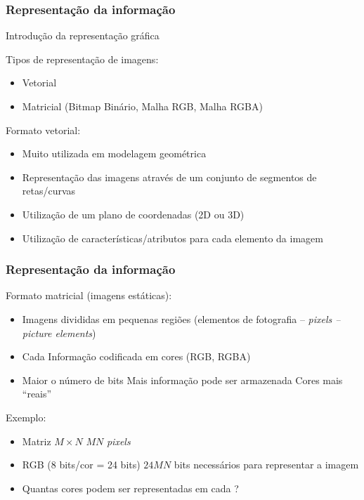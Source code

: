 \documentclass[xcolor]{beamer}
\begin{document}
\begin{frame}
    \frametitle{Representação da informação}

    Introdução da representação gráfica

    \vspace{0.25cm}

    Tipos de representação de imagens:

    \begin{itemize}
        \item Vetorial
        \item Matricial (Bitmap Binário, Malha RGB, Malha RGBA)
    \end{itemize}

    Formato vetorial:

    \begin{itemize}
        \item Muito utilizada em modelagem geométrica
        \item Representação das imagens através de um conjunto de segmentos de
              retas/curvas
        \item Utilização de um plano de coordenadas (2D ou 3D)
        \item Utilização de características/atributos para cada elemento da
              imagem
    \end{itemize}
\end{frame}

\begin{frame}
    \frametitle{Representação da informação}

    Formato matricial (imagens estáticas):

    \begin{itemize}
        \item Imagens divididas em pequenas regiões (elementos de fotografia --
              {\it pixels -- picture elements})
        \item Cada \pixel \implica Informação codificada em cores (RGB,
              RGBA)
        \item Maior o número de bits \implica Mais informação pode ser
              armazenada \implica Cores mais ``reais''
    \end{itemize}

    Exemplo:

    \begin{itemize}
        \item Matriz $M \times N$ \implica $MN$ {\it pixels}
        \item RGB (8 bits/cor = 24 bits) \implica $24 MN$ bits necessários para
              representar a imagem
        \item Quantas cores podem ser representadas em cada \pixel?
    \end{itemize}
\end{frame}
\end{document}
